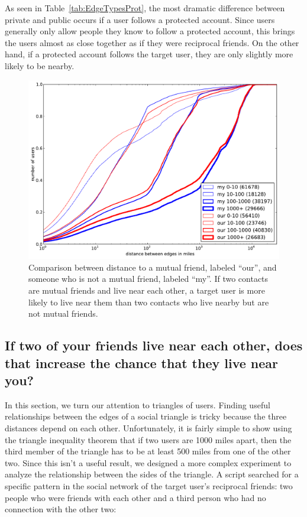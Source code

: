 \documentclass[letterpaper]{article}
\begin{document}
As seen in Table~\ref{tab:EdgeTypesProt}, the most dramatic difference between
private and public occurs if a user follows a protected account.
%
Since users generally only allow people they know to follow a protected
account, this brings the users almost as close together as if they were
reciprocal friends.
%
On the other hand, if a protected account follows the target user, they
are only slightly more likely to be nearby.

\begin{figure}[tbh]
\centering
\includegraphics[width=\linewidth]{figures/near_triads.pdf}
\caption{
Comparison between distance to a mutual friend, labeled ``our'', and someone
who is not a mutual friend, labeled ``my''.
If two contacts are mutual friends and live near each other, a target user is
more likely to live near them than two contacts who live nearby but are not
mutual friends.
}
\label{fig:NearTriads}
\end{figure}

\subsection{If two of your friends live near each other, does that increase the
chance that they live near you?}

In this section, we turn our attention to triangles of users.
Finding useful relationships between the edges of a social triangle is tricky
because the three distances depend on each other.
Unfortunately, it is fairly simple to show using the triangle inequality theorem
that if two users are 1000 miles apart, then the third member of the triangle
has to be at least 500 miles from one of the other two.
Since this isn't a useful result, we designed a more complex experiment to
analyze the relationship between the sides of the triangle.
A script searched for a specific pattern in the social network of
the target user's reciprocal friends: two people who were friends with each
other and a third person who had no connection with the other two:
\end{document}
